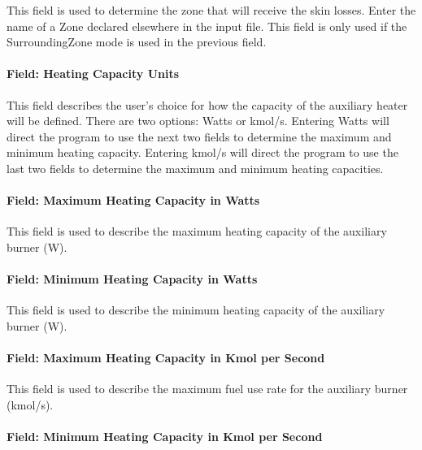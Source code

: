 This field is used to determine the zone that will receive the skin losses. Enter the name of a Zone declared elsewhere in the input file. This field is only used if the SurroundingZone mode is used in the previous field.

\paragraph{Field: Heating Capacity Units}\label{field-heating-capacity-units}

This field describes the user's choice for how the capacity of the auxiliary heater will be defined. There are two options: Watts or kmol/s. Entering Watts will direct the program to use the next two fields to determine the maximum and minimum heating capacity. Entering kmol/s will direct the program to use the last two fields to determine the maximum and minimum heating capacities.

\paragraph{Field: Maximum Heating Capacity in Watts}\label{field-maximum-heating-capacity-in-watts}

This field is used to describe the maximum heating capacity of the auxiliary burner (W).

\paragraph{Field: Minimum Heating Capacity in Watts}\label{field-minimum-heating-capacity-in-watts}

This field is used to describe the minimum heating capacity of the auxiliary burner (W).

\paragraph{Field: Maximum Heating Capacity in Kmol per Second}\label{field-maximum-heating-capacity-in-kmol-per-second}

This field is used to describe the maximum fuel use rate for the auxiliary burner (kmol/s).

\paragraph{Field: Minimum Heating Capacity in Kmol per Second}\label{field-minimum-heating-capacity-in-kmol-per-second}

